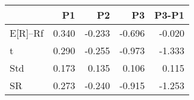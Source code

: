 \begin{tabular}{lrrrr}
\toprule
 & P1 & P2 & P3 & P3-P1 \\
\midrule
E[R]--Rf & 0.340 & -0.233 & -0.696 & -0.020 \\
t & 0.290 & -0.255 & -0.973 & -1.333 \\
Std & 0.173 & 0.135 & 0.106 & 0.115 \\
SR & 0.273 & -0.240 & -0.915 & -1.253 \\
\bottomrule
\end{tabular}
